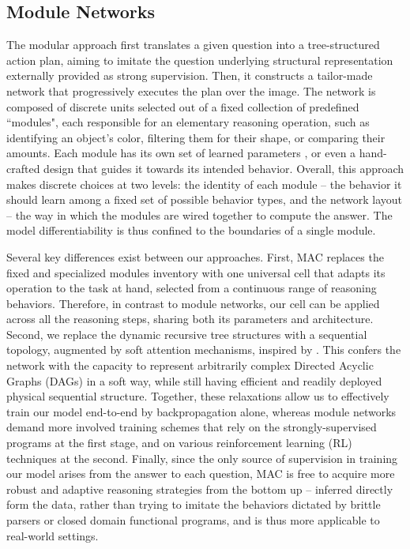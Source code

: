 \documentclass[fleqn]{article}
\begin{document}
\subsection{Module Networks}

The modular approach \citep{nmn,nmn2,nmn3,pgee} first translates a given question into a tree-structured action plan, aiming to imitate the question underlying structural representation externally provided as strong supervision. Then, it constructs a tailor-made network that progressively executes the plan over the image. The network is composed of discrete units selected out of a fixed collection of predefined ``modules", each responsible for an elementary reasoning operation, such as identifying an object's color, filtering them for their shape, or comparing their amounts. Each module has its own set of learned parameters \citep{pgee}, or even a hand-crafted design \citep{nmn} that guides it towards its intended behavior. Overall, this approach makes discrete choices at two levels: the identity of each module -- the behavior it should learn among a fixed set of possible behavior types, and the network layout -- the way in which the modules are wired together to compute the answer. The model differentiability is thus confined to the boundaries of a single module. 

Several key differences exist between our approaches. First, MAC replaces the fixed and specialized modules inventory with one universal cell that adapts its operation to the task at hand, selected from a continuous range of reasoning behaviors. Therefore, in contrast to module networks, our cell can be applied across all the reasoning steps, sharing both its parameters and architecture. Second, we replace the dynamic recursive tree structures with a sequential topology, augmented by soft attention mechanisms, inspired by \citet{alignTrans}. This confers the network with the capacity to represent arbitrarily complex Directed Acyclic Graphs (DAGs) in a soft way, while still having efficient and readily deployed physical sequential structure. Together, these relaxations allow us to effectively train our model end-to-end by backpropagation alone, whereas module networks demand more involved training schemes that rely on the strongly-supervised programs at the first stage, and on various reinforcement learning (RL) techniques at the second. Finally, since the only source of supervision in training our model arises from the answer to each question, MAC is free to acquire more robust and adaptive reasoning strategies from the bottom up -- inferred directly form the data, rather than trying to imitate the behaviors dictated by brittle parsers or closed domain functional programs, and is thus more applicable to real-world settings.    
\end{document}
